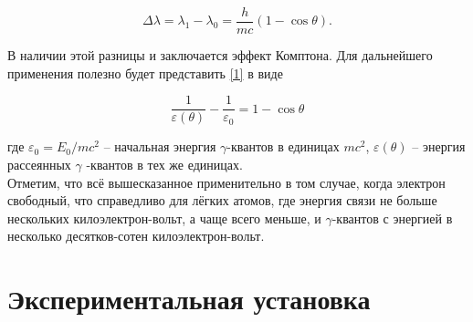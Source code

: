 \documentclass[15pt,a5paper,reqno]{article}
\begin{document}
\begin{equation}\label{1}
    \Delta \lambda = \lambda_1 - \lambda_0 = \dfrac{h}{mc} (1-\cos \theta).
\end{equation}

В наличии этой разницы и заключается эффект Комптона. Для дальнейшего применения полезно будет представить \eqref{1} в виде

\[ \frac{1}{\varepsilon(\theta)} - \dfrac{1}{\varepsilon_0} = 1 - \cos \theta \]

где $\varepsilon_0 = E_0/mc^2$ -- начальная энергия $\gamma$-квантов в единицах $mc^2$, $\varepsilon(\theta)$ -- энергия рассеянных $\gamma$ -квантов в тех же единицах.\\

Отметим, что всё вышесказанное применительно в том случае, когда электрон свободный, что справедливо для лёгких атомов, где энергия связи не больше нескольких килоэлектрон-вольт, а чаще всего меньше, и $\gamma$-квантов с энергией в несколько десятков-сотен килоэлектрон-вольт.

\section{Экспериментальная установка}



\end{document}
